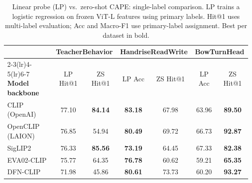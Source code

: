 \documentclass[symmetry,article,submit,pdftex,moreauthors]{Definitions/mdpi}
\begin{document}
\begin{table}[H]
\caption{Linear probe (LP) vs.\ zero-shot CAPE: single-label comparison. LP trains a logistic regression on frozen ViT-L features using primary labels. Hit@1 uses multi-label evaluation; Acc and Macro-F1 use primary-label assignment. Best per dataset in bold.}
\label{tab:linear_probe}
\centering
\small
\setlength{\tabcolsep}{3pt}
\begin{tabular}{l cc cc cc}
\toprule
 & \multicolumn{2}{c}{\textbf{TeacherBehavior}} & \multicolumn{2}{c}{\textbf{HandriseReadWrite}} & \multicolumn{2}{c}{\textbf{BowTurnHead}} \\
\cmidrule(lr){2-3}\cmidrule(lr){4-5}\cmidrule(lr){6-7}
\textbf{Model backbone} & LP Hit@1 & ZS Hit@1 & LP Acc & ZS Hit@1 & LP Acc & ZS Hit@1 \\
\midrule
CLIP (OpenAI) & 77.10 & \textbf{84.14} & \textbf{83.18} & 67.98 & 63.96 & \textbf{89.50} \\
OpenCLIP (LAION) & 76.85 & 54.94 & \textbf{80.49} & 69.72 & 66.73 & \textbf{92.87} \\
SigLIP2 & 76.33 & \textbf{85.56} & \textbf{73.19} & 64.45 & 67.33 & \textbf{82.38} \\
EVA02-CLIP & 75.77 & 64.35 & \textbf{76.78} & 60.62 & 59.21 & \textbf{65.35} \\
DFN-CLIP & 71.98 & 45.86 & \textbf{80.61} & 73.73 & 60.20 & \textbf{93.27} \\
\bottomrule
\end{tabular}
\end{table}
\end{document}
